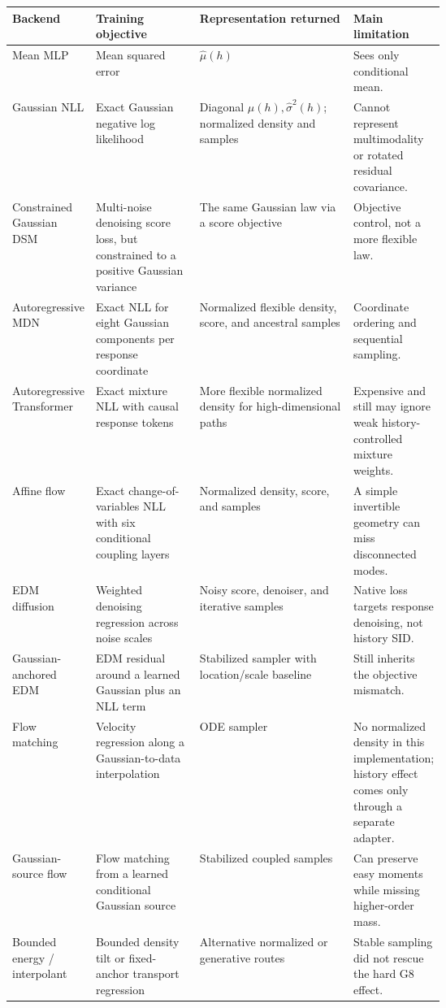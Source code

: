 \documentclass[11pt]{article}
\begin{document}
\begin{center}
\small
\begin{tabularx}{\linewidth}{@{}p{0.18\linewidth} p{0.24\linewidth} X p{0.20\linewidth}@{}}
\toprule
Backend & Training objective & Representation returned & Main limitation \\
\midrule
Mean MLP & Mean squared error & $\widehat\mu(h)$ & Sees only conditional mean. \\
Gaussian NLL & Exact Gaussian negative log likelihood & Diagonal
$\widehat\mu(h),\widehat\sigma^2(h)$; normalized density and samples & Cannot represent
multimodality or rotated residual covariance. \\
Constrained Gaussian DSM & Multi-noise denoising score loss, but constrained to a
positive Gaussian variance & The same Gaussian law via a score objective & Objective
control, not a more flexible law. \\
Autoregressive MDN & Exact NLL for eight Gaussian components per response coordinate &
Normalized flexible density, score, and ancestral samples & Coordinate ordering and
sequential sampling. \\
Autoregressive Transformer & Exact mixture NLL with causal response tokens & More
flexible normalized density for high-dimensional paths & Expensive and still may
ignore weak history-controlled mixture weights. \\
Affine flow & Exact change-of-variables NLL with six conditional coupling layers &
Normalized density, score, and samples & A simple invertible geometry can miss
disconnected modes. \\
EDM diffusion & Weighted denoising regression across noise scales & Noisy score,
denoiser, and iterative samples & Native loss targets response denoising, not history SID. \\
Gaussian-anchored EDM & EDM residual around a learned Gaussian plus an NLL term &
Stabilized sampler with location/scale baseline & Still inherits the objective mismatch. \\
Flow matching & Velocity regression along a Gaussian-to-data interpolation & ODE
sampler & No normalized density in this implementation; history effect comes only
through a separate adapter. \\
Gaussian-source flow & Flow matching from a learned conditional Gaussian source &
Stabilized coupled samples & Can preserve easy moments while missing higher-order mass. \\
Bounded energy / interpolant & Bounded density tilt or fixed-anchor transport regression &
Alternative normalized or generative routes & Stable sampling did not rescue the hard
G8 effect. \\
\bottomrule
\end{tabularx}
\end{center}
\end{document}
